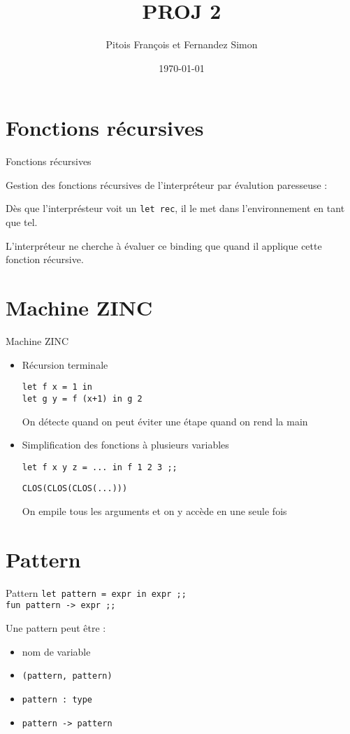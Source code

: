 \documentclass{beamer}
\title{PROJ 2}
\author{Pitois François et Fernandez Simon}
\institute{ENS Lyon}
\date{\today}
\begin{document}
\begin{frame}
\titlepage
\end{frame}

\section{Fonctions récursives}
\begin{frame}{Fonctions récursives}

  Gestion des fonctions récursives de l'interpréteur par évalution paresseuse :

  Dès que l'interprésteur voit un \texttt{let rec}, il le met dans l'environnement en tant que tel.

  L'interpréteur ne cherche à évaluer ce binding que quand il applique cette fonction récursive.

\end{frame}


\section{Machine ZINC}
\begin{frame}{Machine ZINC}
\begin{itemize}
	\item Récursion terminale 

	\texttt{let f x = 1 in \\ 
	let g y = f (x+1) in g 2}
		
	On détecte quand on peut éviter une étape quand on rend la main
\item Simplification des fonctions à plusieurs variables 
  
	\texttt{let f x y z = ... in f 1 2 3 ;;}
	
	\texttt{CLOS(CLOS(CLOS(...)))}
	
	On empile tous les arguments et on y accède en une seule fois
\end{itemize}	
\end{frame}


\section{Pattern}
\begin{frame}{Pattern}
  \texttt{let pattern = expr in expr ;;\\
	fun pattern -> expr ;;}

  Une pattern peut être :
  \begin{itemize}
  \item nom de variable
  \item \texttt{(pattern, pattern)}
  \item \texttt{pattern : type}
  \item \texttt{pattern -> pattern}
  \end{itemize}
\end{frame}
\end{document}
